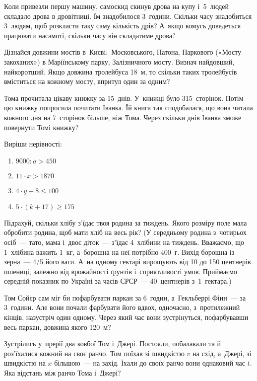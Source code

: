 Коли привезли першу машину, самоскид скинув дрова на купу і~5~людей
складало дрова в дровітниці. Їм знадобилося 3~години.
Скільки часу знадобиться 3~людям, щоб розкласти таку саму кількість дрів?
А~якщо комусь доведеться працювати насамоті, скільки часу він складатиме дрова?


\problem
Дізнайся довжини мостів в~Києві: Московського, Патона,
Паркового («Мосту закоханих») в Маріїнському парку, Залізничного мосту.
Визнач найдовший, найкоротший.
Якщо довжина тролейбуса 18~м, то скільки таких тролейбусів
вміститься на кожному мосту, впритул один за одним?


\problem
Тома прочитала цікаву книжку за 15~днів. У~книжці було 315~сторінок.
Потім цю книжку попросила почитати Іванка. Їй книга так сподобалася,
що вона читала кожного дня на 7~сторінок більше, ніж Тома.
Через скільки днів Іванка зможе повернути Томі книжку?


\problem
Виріши нерівності:
\begin{multicols}{2}
    \begin{enumerate}
        \item $9000 : a > 450$
        \item $11 \cdot x > 1870$
        \item $4 \cdot y - 8 \leqslant 100$
        \item $5 \cdot (k + 17) \geqslant 175$
    \end{enumerate}
\end{multicols}


\problem
Підрахуй, скільки хлібу з’їдає твоя родина за тиждень.
Якого розміру поле мала обробити родина, щоб мати хліб на весь рік?
(У середньому родина з~чотирьох осіб~--- тато, мама і~двоє діток~---
з’їдає 4~хлібини на тиждень. Вважаємо, що 1~хлібина важить 1~кг,
а~борошна на неї потрібно 400~г. Вихід борошна із зерна~--- 4/5 його ваги.
А~на одному гектарі вирощують від 10 до 150 центнерів пшениці,
залежно від врожайності ґрунтів і~сприятливості умов.
Приймаємо середній показник по Україні за часів СРСР~---
40~центнерів з~1~гектара.)


\problem
Том Сойєр сам міг би пофарбувати паркан за 6~годин,
а~Гекльберрі Фінн~--- за 3~години. Але вони почали фарбувати його вдвох,
одночасно, з~протилежний кінців, назустріч один одному.
Через який час вони зустрінуться, пофарбувавши весь паркан,
довжина якого 120~м?


\problem
Зустрілись у~прерії два ковбої Том і~Джері. Постояли, побалакали та й
роз’їхалися кожний на своє ранчо. Том поїхав зі швидкістю $v$ на схід,
а~Джері, зі швидкістю на $x$ більшою~--- на захід. Їхали до своїх ранчо
вони однаковий час $t$. Яка відстань між ранчо Тома і~Джері?

